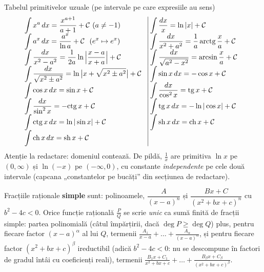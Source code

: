 {Tabelul primitivelor uzuale (pe intervale pe care expresiile au sens)}
\[
\renewcommand{\arraystretch}{1.55}\setlength{\arraycolsep}{3pt}
\begin{array}{ll|ll}
\displaystyle\int x^{a}\,dx=\frac{x^{a+1}}{a+1}+\mathcal C\ (a\neq-1) &&
\displaystyle\int \frac{dx}{x}=\ln|x|+\mathcal C &\\[2pt]
\displaystyle\int a^{x}\,dx=\frac{a^{x}}{\ln a}+\mathcal C\ \ (e^x\mapsto e^x) &&
\displaystyle\int \frac{dx}{x^{2}+a^{2}}=\frac1a\,\mathrm{arctg}\,\frac xa+\mathcal C &\\[2pt]
\displaystyle\int \frac{dx}{x^{2}-a^{2}}=\frac{1}{2a}\ln\Big|\frac{x-a}{x+a}\Big|+\mathcal C &&
\displaystyle\int \frac{dx}{\sqrt{a^{2}-x^{2}}}=\arcsin\frac xa+\mathcal C &\\[2pt]
\displaystyle\int \frac{dx}{\sqrt{x^{2}\pm a^{2}}}=\ln\big|x+\sqrt{x^{2}\pm a^{2}}\big|+\mathcal C &&
\displaystyle\int \sin x\,dx=-\cos x+\mathcal C &\\[2pt]
\displaystyle\int \cos x\,dx=\sin x+\mathcal C &&
\displaystyle\int \frac{dx}{\cos^{2}x}=\mathrm{tg}\,x+\mathcal C &\\[2pt]
\displaystyle\int \frac{dx}{\sin^{2}x}=-\mathrm{ctg}\,x+\mathcal C &&
\displaystyle\int \mathrm{tg}\,x\,dx=-\ln|\cos x|+\mathcal C &\\[2pt]
\displaystyle\int \mathrm{ctg}\,x\,dx=\ln|\sin x|+\mathcal C &&
\displaystyle\int \mathrm{sh}\,x\,dx=\mathrm{ch}\,x+\mathcal C &\\[2pt]
\displaystyle\int \mathrm{ch}\,x\,dx=\mathrm{sh}\,x+\mathcal C && &
\end{array}
\]
Atenție la redactare: domeniul contează. De pildă, $\frac1x$ are primitiva $\ln x$ pe $(0,\infty)$ și $\ln(-x)$ pe $(-\infty,0)$, cu constante \emph{independente} pe cele două intervale (capcana „constantelor pe bucăți'' din secțiunea de redactare).


\begin{teorema}
Fracțiile raționale \textbf{simple} sunt: polinoamele, $\dfrac{A}{(x-a)^{n}}$ și $\dfrac{Bx+C}{(x^{2}+bx+c)^{n}}$ cu $b^{2}-4c<0$. Orice funcție rațională $\frac{P}{Q}$ se scrie \emph{unic} ca sumă finită de fracții simple: partea polinomială (câtul împărțirii, dacă $\deg P\ge\deg Q$) plus, pentru fiecare factor $(x-a)^{\alpha}$ al lui $Q$, termenii $\frac{A_1}{x-a}+\dots+\frac{A_\alpha}{(x-a)^{\alpha}}$, și pentru fiecare factor $(x^{2}+bx+c)^{\beta}$ ireductibil (adică $b^2-4c<0$: nu se descompune în factori de gradul întâi cu coeficienți reali), termenii $\frac{B_1x+C_1}{x^{2}+bx+c}+\dots+\frac{B_\beta x+C_\beta}{(x^{2}+bx+c)^{\beta}}$.
\end{teorema}

